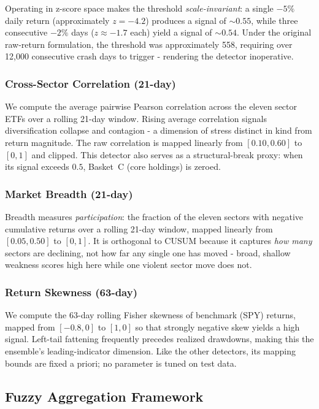\documentclass[11pt]{article}
\begin{document}
Operating in z-score space makes the threshold \emph{scale-invariant}: a
single $-5\%$ daily return (approximately $z = -4.2$) produces a signal
of $\sim\!0.55$, while three consecutive $-2\%$ days ($z \approx -1.7$
each) yield a signal of $\sim\!0.54$.  Under the original raw-return
formulation, the threshold was approximately 558, requiring over
12{,}000 consecutive crash days to trigger - rendering the detector
inoperative.

\subsubsection{Cross-Sector Correlation (21-day)}
We compute the average pairwise Pearson correlation across the eleven
sector ETFs over a rolling 21-day window. Rising average correlation
signals diversification collapse and contagion - a dimension of stress
distinct in kind from return magnitude. The raw correlation is mapped
linearly from $[0.10, 0.60]$ to $[0,1]$ and clipped. This detector also
serves as a structural-break proxy: when its signal exceeds $0.5$,
Basket~C (core holdings) is zeroed.

\subsubsection{Market Breadth (21-day)}
Breadth measures \emph{participation}: the fraction of the eleven
sectors with negative cumulative returns over a rolling 21-day window,
mapped linearly from $[0.05, 0.50]$ to $[0,1]$. It is orthogonal to
CUSUM because it captures \emph{how many} sectors are declining, not
how far any single one has moved - broad, shallow weakness scores high
here while one violent sector move does not.

\subsubsection{Return Skewness (63-day)}
We compute the 63-day rolling Fisher skewness of benchmark (SPY)
returns, mapped from $[-0.8, 0]$ to $[1, 0]$ so that strongly negative
skew yields a high signal. Left-tail fattening frequently precedes
realized drawdowns, making this the ensemble's leading-indicator
dimension. Like the other detectors, its mapping bounds are fixed a
priori; no parameter is tuned on test data.

\subsection{Fuzzy Aggregation Framework}
\end{document}
